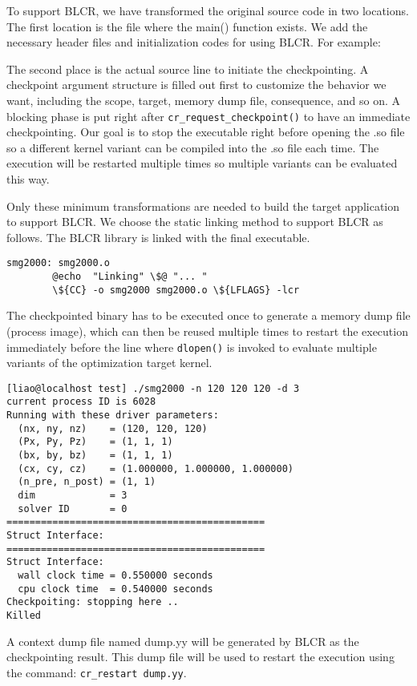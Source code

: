 To support BLCR, we have transformed the original source code in two locations.
The first location is the file where the main() function exists. We add the necessary
header files and initialization codes for using BLCR.  For example:


The second place is the actual source line to initiate the checkpointing. 
A checkpoint argument structure is filled out first to customize the
behavior we want, including the scope, target, memory dump file,
consequence, and so on. A blocking phase is put right after
\lstinline{cr_request_checkpoint()} to have an immediate checkpointing.
Our goal is to stop the executable right before opening the .so file so
a different kernel variant can be compiled into the .so file each time. 
The execution will be restarted multiple times so multiple variants can 
be evaluated this way. 



Only these minimum transformations are needed to build the target application to support
BLCR. We choose the static linking method to support BLCR as follows.
The BLCR library is linked with the final executable. 

{\mySmallFontSize
\begin{verbatim}
smg2000: smg2000.o
        @echo  "Linking" \$@ "... "
        \${CC} -o smg2000 smg2000.o \${LFLAGS} -lcr
\end{verbatim}
}

The checkpointed binary has to be executed once to generate a memory dump
file (process image), which can then be reused multiple times to restart the execution 
immediately before the line where \lstinline{dlopen()} is invoked to evaluate multiple
variants of the optimization target kernel.

{\mySmallFontSize
\begin{verbatim}
[liao@localhost test] ./smg2000 -n 120 120 120 -d 3
current process ID is 6028
Running with these driver parameters:
  (nx, ny, nz)    = (120, 120, 120)
  (Px, Py, Pz)    = (1, 1, 1)
  (bx, by, bz)    = (1, 1, 1)
  (cx, cy, cz)    = (1.000000, 1.000000, 1.000000)
  (n_pre, n_post) = (1, 1)
  dim             = 3
  solver ID       = 0
=============================================
Struct Interface:
=============================================
Struct Interface:
  wall clock time = 0.550000 seconds
  cpu clock time  = 0.540000 seconds
Checkpoiting: stopping here ..
Killed
\end{verbatim}
}

A context dump file named dump.yy will be generated by BLCR as the
checkpointing result. This dump file will be used to restart the execution using
the command: \lstinline{cr_restart dump.yy}.

